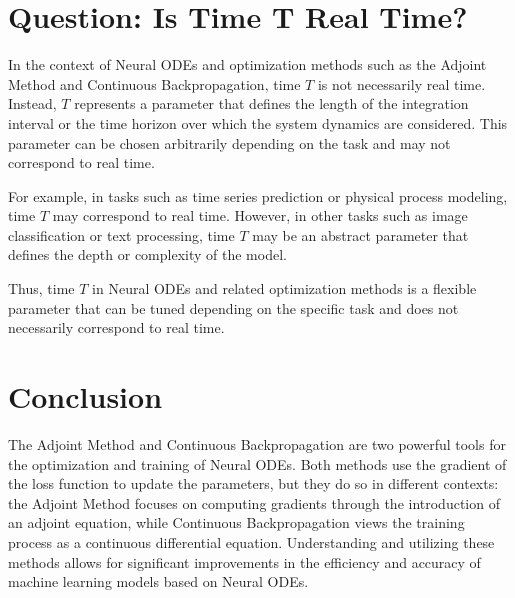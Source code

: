 \documentclass[a4paper,12pt]{article}
\theoremstyle{plain} %
\theoremstyle{definition} %
\theoremstyle{remark} %
\begin{document}
\section{Question: Is Time T Real Time?}

In the context of Neural ODEs and optimization methods such as the Adjoint Method and Continuous Backpropagation, time \( T \) is not necessarily real time. Instead, \( T \) represents a parameter that defines the length of the integration interval or the time horizon over which the system dynamics are considered. This parameter can be chosen arbitrarily depending on the task and may not correspond to real time.

For example, in tasks such as time series prediction or physical process modeling, time \( T \) may correspond to real time. However, in other tasks such as image classification or text processing, time \( T \) may be an abstract parameter that defines the depth or complexity of the model.

Thus, time \( T \) in Neural ODEs and related optimization methods is a flexible parameter that can be tuned depending on the specific task and does not necessarily correspond to real time.

\section{Conclusion}

The Adjoint Method and Continuous Backpropagation are two powerful tools for the optimization and training of Neural ODEs. Both methods use the gradient of the loss function to update the parameters, but they do so in different contexts: the Adjoint Method focuses on computing gradients through the introduction of an adjoint equation, while Continuous Backpropagation views the training process as a continuous differential equation. Understanding and utilizing these methods allows for significant improvements in the efficiency and accuracy of machine learning models based on Neural ODEs.
\end{document}
